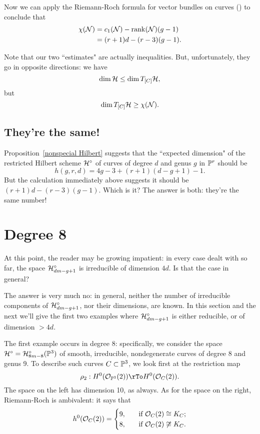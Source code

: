 Now we can apply the Riemann-Roch formula for vector bundles on curves (\cite{3264}) to conclude that
\begin{align*}
\chi({\mathcal N}) &= c_1({\mathcal N}) - \operatorname{rank}({\mathcal N})(g-1) \\
&= (r+1)d - (r-3)(g-1).
\end{align*}

Note that our two ``estimates" are actually inequalities. But, unfortunately, they go in opposite directions: we have
$$
\dim {\cal H} \leq \dim T_{[C]}{\cal H},
$$
but 
$$
\dim T_{[C]}{\cal H} \geq \chi({\mathcal N}).
$$


\subsection{They're the same!} Proposition~\ref{nonspecial Hilbert} suggests that the ``expected dimension" of the restricted Hilbert scheme ${\cal H}^\circ$ of curves of degree $d$ and genus $g$ in ${\mathbb P}^r$ should be 
$$
h(g,r,d) = 4g-3 + (r+1)(d-g+1) - 1.
$$
But the calculation immediately above suggests it should be $(r+1)d - (r-3)(g-1)$. Which is it? The answer is both: they're the same number!


\section{Degree 8}

At this point, the reader may be growing impatient: in every case dealt with so far, the space ${\cal H}^\circ_{dm-g+1}$ is irreducible of dimension $4d$. Is that the case in general?

The answer is very much no: in general, neither the number of irreducible components of ${\cal H}^\circ_{dm-g+1}$, nor their dimensions, are known. In this section and the next we'll give the first two examples where ${\cal H}^\circ_{dm-g+1}$ is either reducible, or of dimension $>4d$.

The first example occurs in degree 8: specifically, we consider the space ${\cal H}^\circ = {\cal H}^\circ_{8m-8}({\mathbb P}^3)$ of smooth, irreducible, nondegenerate curves of degree 8 and genus 9. To describe such curves $C \subset {\mathbb P}^3$, we look first at the restriction map
$$
\rho_2 : H^0(\cO_{\PP^3}(2)) \rTo H^0(\cO_C(2)).
$$
The space on the left has dimension 10, as always. As for the space on the right, Riemann-Roch is ambivalent: it says that
\begin{align*}
h^0({\mathcal O}_C(2)) =
\begin{cases}
9, \quad &\text{if } {\mathcal O}_C(2) \cong K_C; \\
8,  \quad &\text{if } {\mathcal O}_C(2) \not\cong K_C.
\end{cases}
\end{align*}

